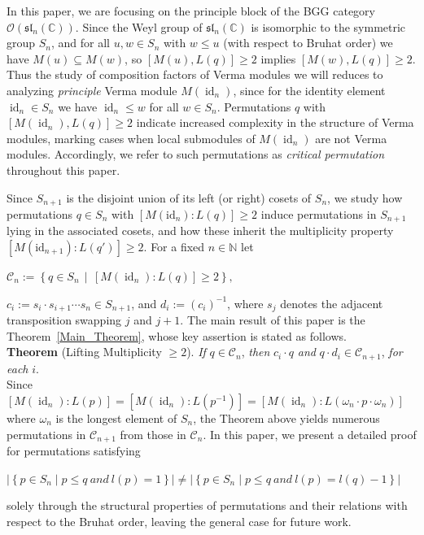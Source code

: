 \documentclass[a4 paper,12pt]{article}
\newcommand{\ger}[1]{\mathfrak{#1}}
\newcommand{\OO}{\mathcal{O}}
\newcommand{\ma}{\leqslant}
\newcommand{\CC}{\mathbb{C}}
\newcommand{\NN}{\mathbb{N}}
\DeclareMathOperator{\id}{id}
\begin{document}
In this paper, we are focusing on the principle block of the BGG category $\OO(\ger{sl}_{n}(\CC))$. Since the Weyl group of $\ger{sl}_{n}(\CC)$ is isomorphic to  the symmetric group $S_{n}$, and  for all $u,w\in S_n$ with $w\ma u$ (with respect to Bruhat order) we have   $M(u)\subseteq M(w)$, so   $[M(u),L(q)]\geq  2$ implies $[M(w),L(q)]\geq  2$. Thus the study of composition factors of Verma modules we will reduces to analyzing \textit{principle} Verma module $M(\id_{n})$, since for  the identity element $\id_{n}\in S_{n}$ we have $\id_n\ma w$ for all $w\in S_n$. Permutations $q$ with $[M(\id_{n}),L(q)]\geq  2$ indicate  increased complexity in the structure  of Verma modules, marking cases when local submodules of $M(\id_{n})$ are not Verma modules. Accordingly, we refer to such permutations as \textit{critical permutation} throughout this paper.





 Since $S_{n+1}$ is the disjoint union of its left (or right) cosets of $S_n$, we study how permutations $q \in S_n$ with $[M(\mathrm{id}_n):L(q)] \geq 2$ induce permutations in $S_{n+1}$ lying in the associated cosets, and how these inherit the multiplicity property $[M(\mathrm{id}_{n+1}):L(q')] \geq 2$. For a fixed $n\in \NN$ let
\begin{center}
$
\mathcal{C}_{n} := \left\{ q \in S_{n} \,\middle|\, [M(\id_{n}):L(q)] \geq 2 \right\},
$
\end{center}
  $c_{i}:= s_{i}\cdot s_{i+1} \cdots s_{n}\in S_{n+1}$, and  $d_{i}:=\left(c_{i}\right)^{-1}$, where $s_j$ denotes the adjacent transposition swapping $j$ and $j+1$. 
The main result of this paper is the Theorem~\ref{Main_Theorem}, whose key assertion is stated as follows. \\

\textbf{Theorem} (Lifting Multiplicity $\geq 2$). \textit{If} $q\in \mathcal{C}_{n} $, \textit{then} $c_{i}\cdot q $ \textit{and} $  q\cdot d_{i}\in \mathcal{C}_{n+1} $,   \textit{for each} $i$. \\


Since $ [M(\id_n):L(p)] = [M(\id_n):L(p^{-1})] = [M(\id_n):L(\omega_n \cdot p \cdot \omega_n)]$ where $\omega_n$ is the longest element of $S_{n}$,  the Theorem above yields numerous permutations in  $ \mathcal{C}_{n+1} $  from those in  $\mathcal{C}_{n} $. 
In this paper, we present a detailed proof for permutations  satisfying 
\begin{center}
$\left|\left\{p\in S_{n}\mid  p\ma q \ and  \ l(p)=1 
				\right\}\right| \neq \left|\left\{p\in S_{n}\mid p\ma q \ and  \ l(p)=l(q)-1\right\}\right|  $
\end{center}
solely through the structural properties of permutations and their relations with respect to the Bruhat order,  leaving the general case for future work. 
\end{document}
